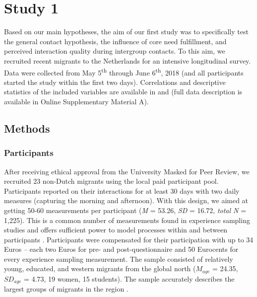 \section{Study 1}

Based on our main hypotheses, the aim of our first study was to
specifically test the general contact hypothesis, the influence of core
need fulfillment, and perceived interaction quality during intergroup
contacts. To this aim, we recruited recent migrants to the Netherlands
for an intensive longitudinal survey. Data were collected from May
5\textsuperscript{th} through June 6\textsuperscript{th}, 2018 (and all
participants started the study within the first two days). Correlations
and descriptive statistics of the included variables are available in
 and  (full data
description is available in Online Supplementary Material A).

\subsection{Methods}

\subsubsection{Participants}

After receiving ethical approval from the University Masked for Peer
Review, we recruited 23 non-Dutch migrants using the local paid
participant pool. Participants reported on their interactions for at
least 30 days with two daily measures (capturing the morning and
afternoon). With this design, we aimed at getting 50-60 measurements per
participant (\textit{M} = 53.26, \textit{SD} = 16.72, \textit{total N} =
1,225). This is a common number of measurements found in experience
sampling studies and offers sufficient power to model processes within
and between participants \citep[e.g.,][]{AanhetRot2012}. Participants
were compensated for their participation with up to 34 Euros -- each two
Euros for pre- and post-questionnaire and 50 Eurocents for every
experience sampling measurement. The sample consisted of relatively
young, educated, and western migrants from the global north (\(M_{age}\)
= 24.35, \(SD_{age}\) = 4.73, 19 women, 15 students). The sample
accurately describes the largest groups of migrants in the region
\citep[see][for a recent report on the largest migrant groups and see Supplemental Material A for a full overview of the demographic composition, including country of origin]{GemeenteGroningen2015}.

